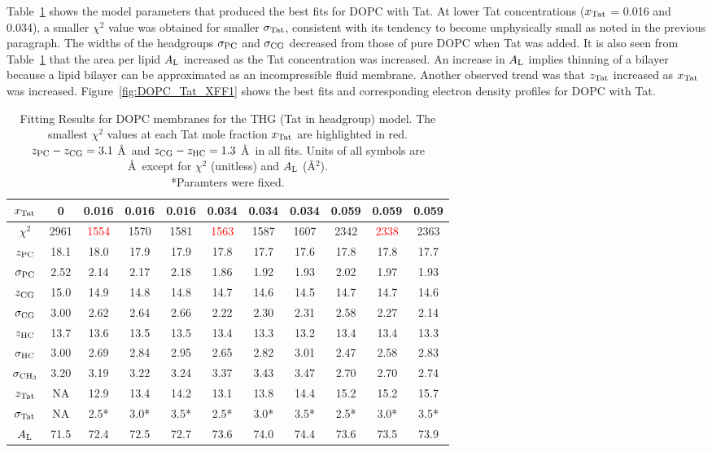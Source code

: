 Table~\ref{tab:DOPC_fit_results} shows the model parameters that produced
the best fits for DOPC with Tat.
At lower Tat concentrations ($x_\textrm{Tat}$ = 0.016 and 0.034), 
a smaller $\chi^2$ value was obtained for smaller $\sigma_\textrm{Tat}$,
consistent with its tendency to become unphysically small as noted 
in the previous paragraph. The widths of the headgroups $\sigma_\textrm{PC}$ and
$\sigma_\textrm{CG}$ decreased from those of pure DOPC when Tat was added.  
It is also seen from Table~\ref{tab:DOPC_fit_results} 
that the area per lipid $A_\textrm{L}$ increased as the Tat concentration was
increased. An increase in $A_\textrm{L}$ implies thinning of a bilayer because
a lipid bilayer can be approximated as an incompressible fluid membrane. 
Another observed trend was that $z_\textrm{Tat}$ increased as $x_\textrm{Tat}$ was increased.
Figure~\ref{fig:DOPC_Tat_XFF1} shows the best fits and corresponding 
electron density profiles for DOPC with Tat.

\begin{table}[htbp]
  \centering
  \begin{tabular}{c|c|ccc|ccc|ccc}
    \hline
    $x_\textrm{Tat}$ & 0 & 0.016 & 0.016 & 0.016 & 0.034 & 0.034 & 0.034 & 0.059 & 0.059 & 0.059 \\
    \hline
    $\chi^2$ & 2961 & \textcolor{red}{1554} & 1570 & 1581 & \textcolor{red}{1563} & 1587 & 1607 & 2342 & \textcolor{red}{2338} & 2363 \\ 
    $z_\textrm{PC}$ & 18.1 & 18.0 & 17.9 & 17.9 & 17.8 & 17.7 & 17.6 & 17.8 & 17.8 & 17.7 \\
    $\sigma_\textrm{PC}$ & 2.52 & 2.14 & 2.17 & 2.18 & 1.86 & 1.92 & 1.93 & 2.02 & 1.97 & 1.93 \\
    $z_\textrm{CG}$ & 15.0 & 14.9 & 14.8 & 14.8 & 14.7 & 14.6 & 14.5 & 14.7 & 14.7 & 14.6 \\
    $\sigma_\textrm{CG}$ & 3.00 & 2.62 & 2.64 & 2.66 & 2.22 & 2.30 & 2.31 & 2.58 & 2.27 & 2.14 \\
    $z_\textrm{HC}$ & 13.7 & 13.6 & 13.5 & 13.5 & 13.4 & 13.3 & 13.2 & 13.4 & 13.4 & 13.3 \\ 
    $\sigma_\textrm{HC}$ & 3.00 & 2.69 & 2.84 & 2.95 & 2.65 & 2.82 & 3.01 & 2.47 & 2.58 & 2.83 \\
    $\sigma_{\textrm{CH}_3}$ & 3.20 & 3.19 & 3.22 & 3.24 & 3.37 & 3.43 & 3.47 & 2.70 & 2.70 & 2.74 \\
    $z_\textrm{Tat}$ & NA & 12.9 & 13.4 & 14.2 & 13.1 & 13.8 & 14.4 & 15.2 & 15.2 & 15.7 \\
    $\sigma_\textrm{Tat}$ & NA & 2.5* & 3.0* & 3.5* & 2.5* & 3.0* & 3.5* & 2.5* & 3.0* & 3.5* \\ 
    $A_\textrm{L}$ & 71.5 & 72.4 & 72.5 & 72.7 & 73.6 & 74.0 & 74.4 & 73.6 & 73.5 & 73.9 \\
    \hline
  \end{tabular}
  \caption{Fitting Results for DOPC membranes for the THG (Tat in headgroup) model. 
  The smallest $\chi^2$ values at each Tat mole fraction $x_\textrm{Tat}$ are highlighted in red.  
  $z_\textrm{PC}-z_\textrm{CG} = 3.1$ \AA\
  and $z_\textrm{CG}-z_\textrm{HC} = 1.3$ \AA\ in all fits.
  Units of all symbols are \AA\ except for $\chi^2$ (unitless) and $A_\textrm{L}$ (\AA$^2$).  
  \\
  *Paramters were fixed.}
  \label{tab:DOPC_fit_results}
\end{table}

